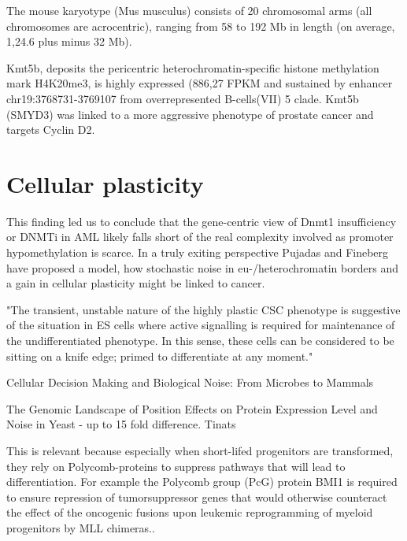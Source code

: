 The mouse karyotype (Mus musculus) consists of 20 chromosomal arms (all chromosomes are acrocentric), ranging from 58 to 192 Mb in length (on average, 1,24.6 plus minus 32 Mb).\cite{Duret2008}


Kmt5b, deposits the pericentric heterochromatin-specific histone methylation mark H4K20me3, is highly expressed (886,27 FPKM and sustained by enhancer chr19:3768731-3769107 from overrepresented B-cells(VII) 5	clade. Kmt5b (SMYD3) was linked to a more aggressive phenotype of prostate cancer and targets Cyclin D2\cite{Vieira2015}.


\section{Cellular plasticity}

This finding led us to conclude that the gene-centric view of Dnmt1 insufficiency\cite{Trowbridge2012} or DNMTi\cite{Zhou2017} in AML likely falls short of the real complexity involved as promoter hypomethylation is scarce. In a truly exiting perspective Pujadas and Fineberg\cite{Pujadas2012} have proposed a model, how stochastic noise in eu-/heterochromatin borders and a gain in cellular plasticity might be linked to cancer. 

\cite{Timp2013}

\cite{Pujadas2012,Wainwright2017}


"The transient, unstable nature of the highly plastic CSC phenotype is suggestive of the situation in ES cells where active signalling is required for maintenance of the undifferentiated phenotype. In this sense, these cells can be considered to be sitting on a knife edge; primed to differentiate at any moment."\cite{Obrienball2017}

Cellular Decision Making and Biological Noise: From Microbes to Mammals\cite{Balazsi2011}

\cite{Stoeger2016}

The Genomic Landscape of Position Effects on Protein Expression Level and Noise in Yeast - up to 15 fold difference. Tinats\cite{Chen2016b}



This is relevant because especially when short-lifed progenitors are transformed, they rely on Polycomb-proteins to suppress pathways that will lead to differentiation. For example the Polycomb group (PcG) protein BMI1 is required to ensure repression of tumorsuppressor genes that would otherwise counteract the effect of the oncogenic fusions upon leukemic reprogramming of myeloid progenitors by MLL chimeras.\cite{Yuan2011,Smith2011}.


